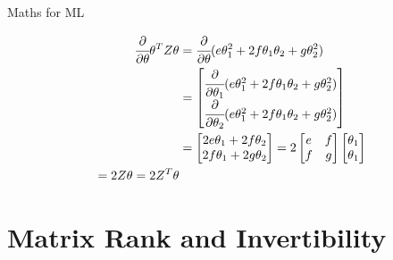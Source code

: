 \documentclass{beamer}
\begin{document}
\begin{frame}{Maths for ML}
    
    \begin{center}
    
        \begin{align*}
             \cfrac{\partial}{\partial \theta} \theta^{T} Z \theta &= \cfrac{\partial}{\partial \theta} (e\theta_{1}^{2} + 2f\theta_{1}\theta_{2}+g\theta_{2}^{2} )\\
            &= \begin{bmatrix}\cfrac{\partial}{\partial \theta_{1}} (e\theta_{1}^{2} + 2f\theta_{1}\theta_{2}+g\theta_{2}^{2} )\\
            \cfrac{\partial}{\partial \theta_{2}} (e\theta_{1}^{2} + 2f\theta_{1}\theta_{2}+g\theta_{2}^{2} )
            \end{bmatrix}\\
            &=\begin{bmatrix}2e\theta_{1}+2f\theta_{2}\\
            2f\theta_{1}+2g\theta_{2}\end{bmatrix}
            =  2\begin{bmatrix}e&f\\f&g\end{bmatrix}\begin{bmatrix}\theta_{1}\\ \theta_{1} \end{bmatrix} \\
            =2Z\theta = 2Z^{T}\theta
    \end{align*}
    \end{center}
\end{frame}

\section{Matrix Rank and Invertibility}
\end{document}
